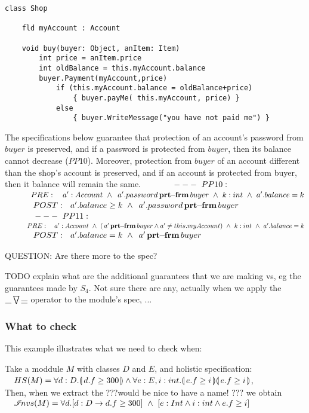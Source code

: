 \begin{lstlisting}
class Shop

    fld myAccount : Account
    
    void buy(buyer: Object, anItem: Item)
        int price = anItem.price
        int oldBalance = this.myAccount.balance
        buyer.Payment(myAccount,price)
            if (this.myAccount.balance = oldBalance+price)
                { buyer.payMe( this.myAccount, price) }
            else
                { buyer.WriteMessage("you have not paid me") }
\end{lstlisting}

The specifications below guarantee that protection of an account's password from $buyer$ is preserved, and if a password is protected from $buyer$, then its balance cannot decrease ($PP10$). Moreover, protection from $buyer$ of an account different than the shop's account is preserved, and if an account is protected from buyer, then it balance will remain the same.
\noindent
$~\strut \ \ \ \ \ \ \ \ \  ---\ PP10:$\\
$\SP PRE:\ \ \ a': Account \ \wedge \ \protectedFrom {a'.password}{buyer} \ \wedge \  k:int \ \wedge \ a'.balance=k$\\
$\SP POST: \ \ a'.balance \geq k \ \wedge\  \protectedFrom {a'.password}{buyer} $
\\
$~\strut \ \ \ \ \ \ \ \ \  ---\ PP11:$\\
$\SP PRE:\ \ \ a': Account \ \wedge \ (\protectedFrom {a'}{buyer} \wedge a'\neq this.myAccount) \ \wedge \  k:int \ \wedge \ a'.balance=k$\\
$\SP POST: \ \ a'.balance = k \ \wedge\  \protectedFrom {a'}{buyer} $

\vspace{.2cm}
QUESTION: Are there more to the spec? 

TODO explain what are the additional guarantees that we are making vs, eg the guarantees made by $S_4$. Not sure there are any, actually when we apply the $ {\_} \bigtriangledown \overline{\_} $ operator to the module's spec, ...

\subsubsection{What to check}
This example illustrates what we need to check when:

Take a moddule $M$ with classes $D$ and $E$, and holistic specification:\\
$\strut \ \ \  HS(M)= \forall {d:D}.{\llparenthesis}\, d.f\geq 300 \,{\rrparenthesis} \wedge  \forall {e:E,i:int}.{\llparenthesis}\, e.f\geq i \,{\rrparenthesis}{\llparenthesis}\, e.f\geq i \,{\rrparenthesis} $,\\
Then, when we extract the ???would be nice to have a name! ??? we obtain\\
$\strut \ \ \   {\mathcal I}\!nvs(M)  = \forall d.[d:D \rightarrow d.f\geq 300]\ \wedge \  [ e:Int \wedge i:int \wedge e.f \geq i]$

